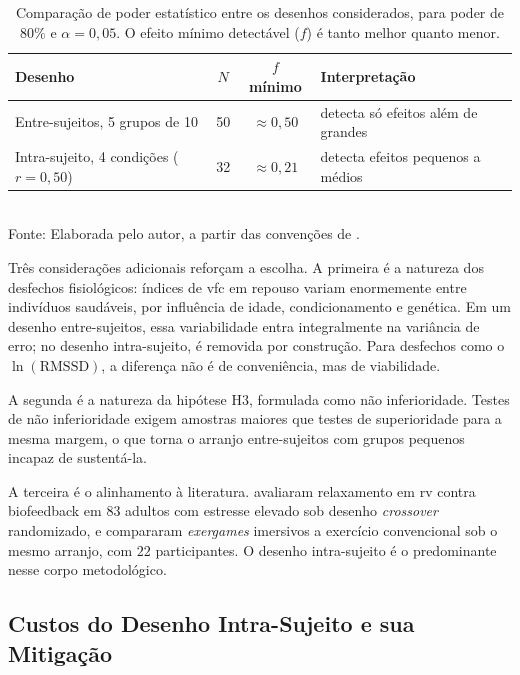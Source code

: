 \begin{table}[H]
    \centering
    \caption{Comparação de poder estatístico entre os desenhos considerados, para poder de $80\%$ e $\alpha = 0{,}05$. O efeito mínimo detectável ($f$) é tanto melhor quanto menor.}
    \label{tab:poder}
    \small
    \begin{tabularx}{\textwidth}{p{5.2cm}ccY}
        \toprule
        \textbf{Desenho} & \textbf{$N$} & \textbf{$f$ mínimo} & \textbf{Interpretação} \\
        \midrule
        Entre-sujeitos, 5 grupos de 10 & 50 & $\approx 0{,}50$ & detecta só efeitos além de grandes \\
        \addlinespace
        Intra-sujeito, 4 condições ($r = 0{,}50$) & 32 & $\approx 0{,}21$ & detecta efeitos pequenos a médios \\
        \bottomrule
    \end{tabularx}\\[2pt]
    {\footnotesize Fonte: Elaborada pelo autor, a partir das convenções de \citet{Cohen1988}.}
\end{table}

Três considerações adicionais reforçam a escolha. A primeira é a natureza dos desfechos fisiológicos: índices de \gls{vfc} em repouso variam enormemente entre indivíduos saudáveis, por influência de idade, condicionamento e genética. Em um desenho entre-sujeitos, essa variabilidade entra integralmente na variância de erro; no desenho intra-sujeito, é removida por construção. Para desfechos como o $\ln(\mathrm{RMSSD})$, a diferença não é de conveniência, mas de viabilidade.

A segunda é a natureza da hipótese H3, formulada como não inferioridade. Testes de não inferioridade exigem amostras maiores que testes de superioridade para a mesma margem, o que torna o arranjo entre-sujeitos com grupos pequenos incapaz de sustentá-la.

A terceira é o alinhamento à literatura. \citet{Kim2021} avaliaram relaxamento em \gls{rv} contra biofeedback em $83$ adultos com estresse elevado sob desenho \textit{crossover} randomizado, e \citet{RubioArias2024} compararam \textit{exergames} imersivos a exercício convencional sob o mesmo arranjo, com $22$ participantes. O desenho intra-sujeito é o predominante nesse corpo metodológico.

\subsection{Custos do Desenho Intra-Sujeito e sua Mitigação}\label{subsec:custos-desenho}

